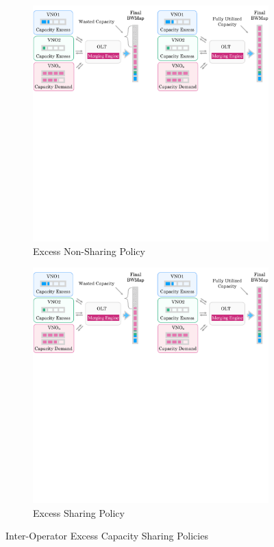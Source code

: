 \begin{figure}[h]
\centering
\begin{subfigure}{0.48\columnwidth}
 \includegraphics[width=\textwidth]{Figures/non-sharing.pdf}
\caption{Excess Non-Sharing Policy}%
\label{nonsharing_p}
\end{subfigure}\hfill%
\begin{subfigure}{0.48\columnwidth}
 \includegraphics[width=\textwidth]{Figures/sharing.pdf}
\caption{Excess Sharing Policy}%
\label{sharing_p}
\end{subfigure}\hfill%
\caption{Inter-Operator Excess Capacity Sharing Policies}
\label{nonsharingvssharing_p}%
\end{figure}

